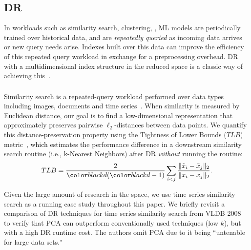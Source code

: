 \subsection{DR }
\label{sec:RQW}

In workloads such as similarity search, clustering, , ML models are periodically trained over historical data, and are \emph{repeatedly queried} as incoming data arrives or new query needs arise. 
Indexes built over this data can improve the efficiency of this repeated query workload in exchange for a preprocessing overhead.
DR with a multidimensional index structure in the reduced space is a classic way of achieving this~\cite{local-dr,dynamic-ss,dm-book,decade,search}.



\subsubsection*{}
Similarity search is a repeated-query workload performed over data types including images, documents and time series~\cite{keogh-study,lsh}.
When similarity is measured by Euclidean distance, our goal is to find a low-dimensional representation that approximately preserves pairwise $\ell_2$-distances between data points. We quantify this distance-preservation property using the Tightness of Lower Bounds ($TLB$) metric~\cite{keogh-study}, which estimates the performance difference in a downstream similarity search routine (i.e., k-Nearest Neighbors) after DR \emph{without} running the routine:  
\begin{equation}
\label{eq:tlb}
TLB = \frac{2}{\mvar(\mvar-1)}\sum_{i<j}\frac{\| \tilde{x}_i -  \tilde{x}_j \|_2 }{\| x_i -  x_j\|_2 }.
\end{equation}

Given the large amount of research in the space, we use time series similarity search as a running case study throughout this paper. 
We briefly revisit a comparison of DR techniques for time series similarity search from VLDB 2008~\cite{keogh-study} to verify that PCA can outperform conventionally used techniques (low $k$), but with a high DR runtime cost.
The authors omit PCA due to it being ``untenable for large data sets." 

